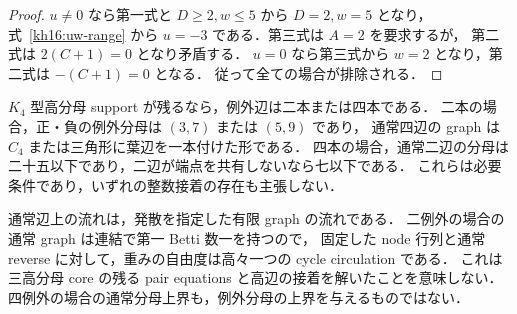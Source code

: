 \begin{proof}
$u\ne0$ なら第一式と $D\geq2,w\leq5$ から $D=2,w=5$ となり，
式~\eqref{kh16:uw-range} から $u=-3$ である．第三式は $A=2$ を要求するが，
第二式は $2(C+1)=0$ となり矛盾する．
$u=0$ なら第三式から $w=2$ となり，第二式は $-(C+1)=0$ となる．
従って全ての場合が排除される．
\end{proof}

\begin{corollary}[$K_4$ の接着に残る二つの型]
\label{kh16:remaining-cases}
$K_4$ 型高分母 support が残るなら，例外辺は二本または四本である．
二本の場合，正・負の例外分母は $(3,7)$ または $(5,9)$ であり，
通常四辺の graph は $C_4$ または三角形に葉辺を一本付けた形である．
四本の場合，通常二辺の分母は二十五以下であり，二辺が端点を共有しないなら七以下である．
これらは必要条件であり，いずれの整数接着の存在も主張しない．
\end{corollary}

\begin{remark}[残る非有界部分]
通常辺上の流れは，発散を指定した有限 graph の流れである．
二例外の場合の通常 graph は連結で第一 Betti 数一を持つので，
固定した node 行列と通常 reverse に対して，重みの自由度は高々一つの cycle circulation である．
これは三高分母 core の残る pair equations と高辺の接着を解いたことを意味しない．
四例外の場合の通常分母上界も，例外分母の上界を与えるものではない．
\end{remark}
